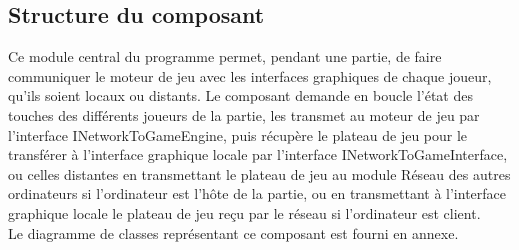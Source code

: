 \subsection{Structure du composant}

Ce module central du programme permet, pendant une partie, de faire communiquer le moteur de jeu avec les interfaces graphiques de chaque joueur, qu'ils soient locaux ou distants. Le composant demande en boucle l'état des touches des différents joueurs de la partie, les transmet au moteur de jeu par l'interface INetworkToGameEngine, puis récupère le plateau de jeu pour le transférer à l'interface graphique locale par l'interface INetworkToGameInterface, ou celles distantes en transmettant le plateau de jeu au module Réseau des autres ordinateurs si l'ordinateur est l'hôte de la partie, ou en transmettant à l'interface graphique locale le plateau de jeu reçu par le réseau si l'ordinateur est client.\\

Le diagramme de classes représentant ce composant est fourni en annexe.